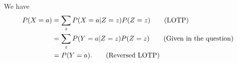 
\setcounter{theorem}{12}
\begin{exercise}[BH.13]
\begin{solution}
	We have
	\begin{align*}
		P(X=a)& = \sum_{z}P(X=a|Z=z)P(Z=z)\tag*{(\text{LOTP})}\\
		& =  \sum_{z}P(Y=a|Z=z)P(Z=z) \tag*{(\text{Given in the question})}\\
		& =  P(Y=a).\tag*{(\text{Reversed LOTP})}
	\end{align*}
\end{solution}
\end{exercise}


